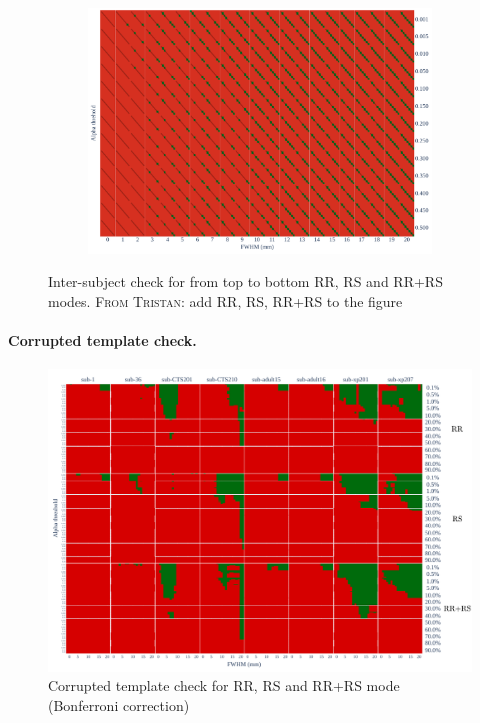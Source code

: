 \documentclass{article}
\newcommand{\TG}[1]{\color{blue}\textsc{From Tristan:} #1\color{black}\xspace}
\begin{document}
\begin{figure}
\begin{subfigure}[t]{0.7\linewidth}
        \includegraphics[width=\linewidth]{figures/inter-subject/one_mct_fwe_bonferroni_RR-RS.pdf}
    \end{subfigure}
    \caption{Inter-subject check for from top to bottom RR, RS and RR+RS modes. \TG{add RR, RS, RR+RS to the figure}}
    \label{fig:ieee-check}
\end{figure}

\paragraph{Corrupted template check.}

\begin{figure}
    \centering
    \includegraphics[width=\linewidth]{figures/template/template_fwe_bonferroni.pdf}
    \caption{Corrupted template check for RR, RS and RR+RS mode (Bonferroni correction)}
    \label{fig:template_bonferroni}
\end{figure}
\end{document}
